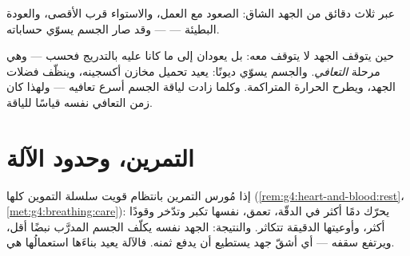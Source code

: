 \begin{omfigure}

{\small {} عبر ثلاث دقائق من الجهد الشاق: الصعود مع العمل،
والاستواء قرب الأقصى، والعودة البطيئة ---  --- وقد صار
الجسم يسوّي حساباته.}
\end{omfigure}

\begin{definition}[التعافي]\label{def:g7:organs-at-work:recovery}
حين يتوقف الجهد لا يتوقف   معه: بل يعودان إلى ما كانا
عليه بالتدريج فحسب --- وهي مرحلة \emph{التعافي}.
والجسم يسوّي ديونًا: يعيد تحميل مخازن أكسجينه، وينظّف فضلات الجهد،
ويطرح الحرارة المتراكمة. وكلما زادت لياقة الجسم أسرع تعافيه ---
ولهذا كان زمن التعافي نفسه قياسًا للياقة.
\end{definition}

\section{التمرين، وحدود الآلة}

\begin{proposition}\label{prop:g7:organs-at-work:training}
إذا مُورس التمرين بانتظام قويت سلسلة التموين كلها
(\cref{rem:g4:heart-and-blood:rest}،
\cref{met:g4:breathing:care}):  يحرّك دمًا أكثر في الدقّة،
  تعمق،  نفسها تكبر وتدّخر وقودًا أكثر،
وأوعيتها الدقيقة تتكاثر. والنتيجة: الجهد نفسه يكلّف الجسم المدرَّب
نبضًا أقل، ويرتفع سقفه --- أي أشقّ جهد يستطيع أن يدفع ثمنه.
فالآلة يعيد بناءَها استعمالُها هي.
\end{proposition}
\admitted

